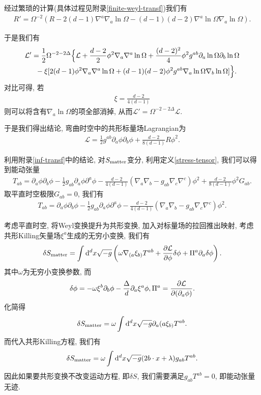 经过繁琐的计算(具体过程见附录\ref{finite-weyl-transf})我们有
\begin{align}
    R'=\Omega^{-2}\left(R-2(d-1)\nabla^a\nabla_a\ln\Omega-(d-1)(d-2)\nabla^a\ln\Omega\nabla_a\ln\Omega\right).
\end{align}

于是我们有
\begin{align}
    \mathcal L'&=\frac12\Omega^{-2-2\Delta}\Bigl\{\mathcal L+\frac{d-2}{2}\phi^2\nabla_a\nabla^a\ln\Omega+\frac{(d-2)^2}4\phi^2g^{ab}\partial_a\ln\Omega\partial_b\ln\Omega\notag\\
    &\;\;-\xi[2(d-1)\phi^2\nabla_a\nabla^a\ln\Omega+(d-1)(d-2)\phi^2g^{ab}\nabla_a\ln\Omega\nabla_b\ln\Omega]\Bigl\}.
\end{align}
对比可得, 若
\begin{align}
    \xi=\frac{d-2}{4(d-1)}
\end{align}
则可以将含有$\nabla_a\ln\Omega$的项全部消掉, 从而$\mathcal L'=\Omega^{-2-2\Delta}\mathcal L$.

于是我们得出结论, 弯曲时空中的共形标量场Lagrangian为
\begin{align}
    \mathcal L=\frac12g^{ab}\partial_a\phi\partial_b\phi+\frac{d-2}{8(d-1)}R\phi^2.
\end{align}

利用附录\ref{inf-transf}中的结论, 对$S_{\rm{matter}}$变分, 利用定义\ref{stress-tensor}, 我们可以得到能动张量
\begin{align}
    T_{ab}=\partial_a\phi\partial_b\phi-\frac12 g_{ab}\partial_a\phi\partial^a\phi-\frac{d-2}{4(d-1)}\left(\nabla_a\nabla_b-g_{ab}\nabla_c\nabla^c\right)\phi^2+\frac{d-2}{8(d-1)}\phi^2G_{ab}.
\end{align}
取平直时空极限$G_{ab}=0$, 我们有
\begin{align}
    T_{ab}=\partial_a\phi\partial_b\phi-\frac12 g_{ab}\partial_a\phi\partial^a\phi-\frac{d-2}{4(d-1)}\left(\nabla_a\nabla_b-g_{ab}\nabla_c\nabla^c\right)\phi^2.
\end{align}

考虑平直时空, 将Weyl变换提升为共形变换, 加入对标量场的拉回推出映射, 考虑共形Killing矢量场$\xi^a$生成的无穷小变换, 我们有
\begin{align}
    \delta S_{\rm{matter}}=\int\d^dx\sqrt{-g}\left(\omega\nabla_{(a}\xi_{b)}T^{ab}+\pa{\mathcal L}\phi\delta\phi+\Pi^a\partial_a\delta\phi\right).
\end{align}
其中$\omega$为无穷小变换参数, 而
\begin{align}
    \delta\phi=-\omega\xi^b\partial_b\phi-\frac{\Delta}{d}\partial_a\xi^a\phi, \Pi^a=\pa{\mathcal L}{(\partial_a\phi)}.
\end{align}
化简得
\begin{align}
    \delta S_{\rm{matter}}=\omega\int\d^dx\sqrt{-g}\partial_a{(a}\xi_{b)}T^{ab}.
\end{align}
而代入共形Killing方程, 我们有
\begin{align}
    \delta S_{\rm{matter}}=\omega\int\d^dx\sqrt{-g}(2b\cdot x+\lambda)g_{ab}T^{ab}.
\end{align}
因此如果要共形变换不改变运动方程, 即$\delta S$, 我们需要满足$g_{ab}T^{ab}=0$, 即能动张量无迹.

